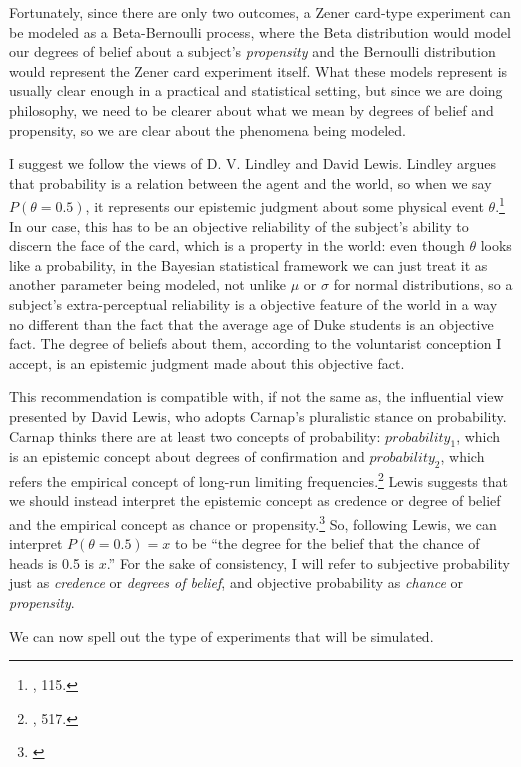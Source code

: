 Fortunately, since there are only two outcomes, a Zener card-type
experiment can be modeled as a Beta-Bernoulli process, where the Beta
distribution would model our degrees of belief about a subject's
\emph{propensity} and the Bernoulli distribution would represent the
Zener card experiment itself. What these models represent is usually
clear enough in a practical and statistical setting, but since we are doing philosophy, we need to be clearer about what we mean by
degrees of belief and propensity, so we are clear about the phenomena being
modeled.

I suggest we follow the views of D. V. Lindley and David Lewis. Lindley
argues that probability is a relation between the agent and the world,
so when we say \(P(\theta=0.5)\), it represents our epistemic judgment about some physical event \(\theta\).\footnote{\cite{lindleybern}, 115.} In our case, this
has to be an objective reliability of the subject's ability to discern the face of the card, which
is a property in the world: even though \(\theta\) looks like a
probability, in the Bayesian statistical framework we can just treat it
as another parameter being modeled, not unlike \(\mu\) or \(\sigma\) for
normal distributions, so a subject's extra-perceptual reliability is a
objective feature of the world in a way no different than the fact that
the average age of Duke students is an objective fact. The degree of
beliefs about them, according to the voluntarist conception I accept, is an epistemic judgment made about this objective fact.
 
 This recommendation is compatible with, if not the same as, the influential
view presented by David Lewis, who adopts Carnap's pluralistic stance on
probability. Carnap thinks there are at least two concepts of
probability: \(probability_1\), which is an epistemic concept about
degrees of confirmation and \(probability_2\), which refers the
empirical concept of long-run limiting frequencies.\footnote{\cite{carnapprob}, 517.} Lewis suggests
that we should instead interpret the epistemic concept as credence or
degree of belief and the empirical concept as chance or
propensity.\footnote{\cite{lewisguide}} So, following Lewis, we can interpret \(P(\theta=0.5)=x\) to
be ``the degree for the belief that the chance of heads is 0.5 is
\(x\).'' For the sake of consistency, I will refer to subjective
probability just as \emph{credence} or \emph{degrees of belief}, and
objective probability as \emph{chance} or \emph{propensity}.

We can now spell out the type of experiments that will be simulated.

